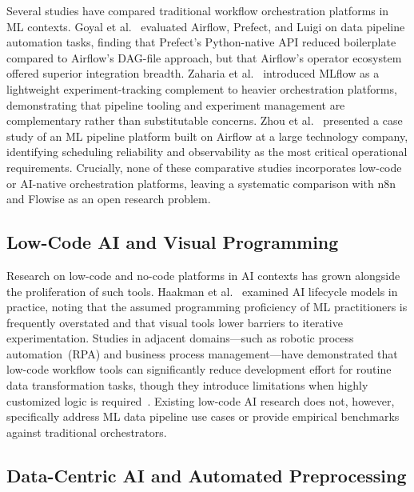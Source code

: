 \documentclass[journal]{IEEEtran}
\begin{document}
Several studies have compared traditional workflow orchestration platforms
in ML contexts. Goyal et al.~\cite{goyal2023automated} evaluated Airflow,
Prefect, and Luigi on data pipeline automation tasks, finding that Prefect's
Python-native API reduced boilerplate compared to Airflow's DAG-file
approach, but that Airflow's operator ecosystem offered superior integration
breadth. Zaharia et al.~\cite{zaharia2018accelerating} introduced MLflow
as a lightweight experiment-tracking complement to heavier orchestration
platforms, demonstrating that pipeline tooling and experiment management
are complementary rather than substitutable concerns. Zhou et al.~\cite{zhou2020towards}
presented a case study of an ML pipeline platform built on Airflow at
a large technology company, identifying scheduling reliability and
observability as the most critical operational requirements. Crucially,
none of these comparative studies incorporates low-code or AI-native
orchestration platforms, leaving a systematic comparison with n8n and
Flowise as an open research problem.

\subsection{Low-Code AI and Visual Programming}

Research on low-code and no-code platforms in AI contexts has grown
alongside the proliferation of such tools. Haakman et al.~\cite{haakman2021ai}
examined AI lifecycle models in practice, noting that the assumed
programming proficiency of ML practitioners is frequently overstated
and that visual tools lower barriers to iterative experimentation.
Studies in adjacent domains---such as robotic process automation~(RPA)
and business process management---have demonstrated that low-code workflow
tools can significantly reduce development effort for routine data
transformation tasks, though they introduce limitations when highly
customized logic is required~\cite{goyal2023automated}. Existing low-code
AI research does not, however, specifically address ML data pipeline use
cases or provide empirical benchmarks against traditional orchestrators.

\subsection{Data-Centric AI and Automated Preprocessing}
\end{document}
